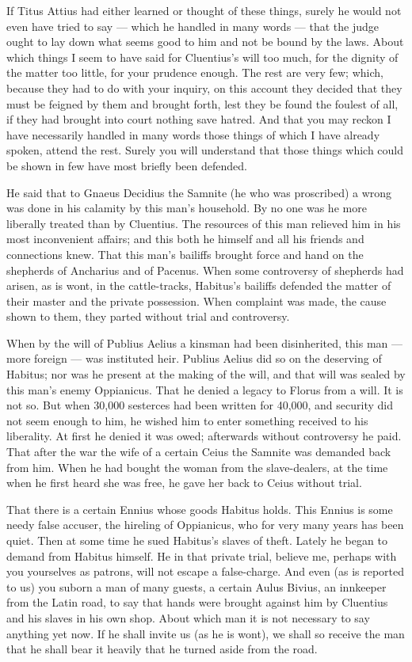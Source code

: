  If Titus Attius had either learned or thought of these things, surely he would not even have tried to say --- which he handled in many words --- that the judge ought to lay down what seems good to him and not be bound by the laws. About which things I seem to have said for Cluentius's will too much, for the dignity of the matter too little, for your prudence enough. The rest are very few; which, because they had to do with your inquiry, on this account they decided that they must be feigned by them and brought forth, lest they be found the foulest of all, if they had brought into court nothing save hatred. And that you may reckon I have necessarily handled in many words those things of which I have already spoken, attend the rest. Surely you will understand that those things which could be shown in few have most briefly been defended.

 He said that to Gnaeus Decidius the Samnite (he who was proscribed) a wrong was done in his calamity by this man's household. By no one was he more liberally treated than by Cluentius. The resources of this man relieved him in his most inconvenient affairs; and this both he himself and all his friends and connections knew. That this man's bailiffs brought force and hand on the shepherds of Ancharius and of Pacenus. When some controversy of shepherds had arisen, as is wont, in the cattle-tracks, Habitus's bailiffs defended the matter of their master and the private possession. When complaint was made, the cause shown to them, they parted without trial and controversy.

 When by the will of Publius Aelius a kinsman had been disinherited, this man --- more foreign --- was instituted heir. Publius Aelius did so on the deserving of Habitus; nor was he present at the making of the will, and that will was sealed by this man's enemy Oppianicus. That he denied a legacy to Florus from a will. It is not so. But when 30,000 sesterces had been written for 40,000, and security did not seem enough to him, he wished him to enter something received to his liberality. At first he denied it was owed; afterwards without controversy he paid. That after the war the wife of a certain Ceius the Samnite was demanded back from him. When he had bought the woman from the slave-dealers, at the time when he first heard she was free, he gave her back to Ceius without trial.

 That there is a certain Ennius whose goods Habitus holds. This Ennius is some needy false accuser, the hireling of Oppianicus, who for very many years has been quiet. Then at some time he sued Habitus's slaves of theft. Lately he began to demand from Habitus himself. He in that private trial, believe me, perhaps with you yourselves as patrons, will not escape a false-charge. And even (as is reported to us) you suborn a man of many guests, a certain Aulus Bivius, an innkeeper from the Latin road, to say that hands were brought against him by Cluentius and his slaves in his own shop. About which man it is not necessary to say anything yet now. If he shall invite us (as he is wont), we shall so receive the man that he shall bear it heavily that he turned aside from the road.


